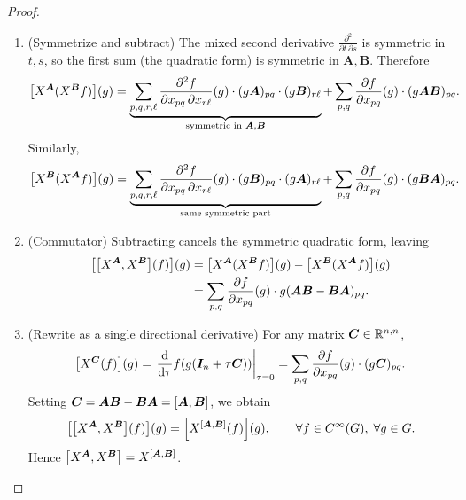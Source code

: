 \documentclass[11pt,reqno]{amsart}
\begin{document}
\begin{proof}
\begin{enumerate}
  \item (Symmetrize and subtract)
  The mixed second derivative $\frac{\partial^2}{\partial t\,\partial s}$ is symmetric in $t,s$,
  so the first sum (the quadratic form) is symmetric in $\bm A,\bm B$.
  Therefore
  \[
    \begin{aligned}
    \FUNC{X^{\bm A}(X^{\bm B}f)}{g}
    &=
    \underbrace{\sum_{p,q,r,\ell}
    \frac{\partial^2 f}{\partial x_{pq}\,\partial x_{r\ell}}(g) \cdot
    (g\bm A)_{pq} \cdot (g\bm B)_{r\ell}}_{\text{symmetric in }\bm A,\bm B}
    +\sum_{p,q}
    \frac{\partial f}{\partial x_{pq}}(g) \cdot
    (g\bm A\bm B)_{pq}.
    \end{aligned}
  \]
  Similarly,
  \[
    \FUNC{X^{\bm B}(X^{\bm A}f)}{g}
    =
    \underbrace{\sum_{p,q,r,\ell}
    \frac{\partial^2 f}{\partial x_{pq}\,\partial x_{r\ell}}(g) \cdot
    (g\bm B)_{pq} \cdot (g\bm A)_{r\ell}}_{\text{same symmetric part}}
    +\sum_{p,q}
    \frac{\partial f}{\partial x_{pq}}(g) \cdot
    (g\bm B\bm A)_{pq}.
  \]

  \item (Commutator)
  Subtracting cancels the symmetric quadratic form, leaving
  \[
    \begin{aligned}
    \FUNC{\SqBr{X^{\bm A}, X^{\bm B}}(f)}{g}
    &=\FUNC{X^{\bm A}(X^{\bm B}f)}{g}
      -\FUNC{X^{\bm B}(X^{\bm A}f)}{g} \\
    &=\sum_{p,q}
    \frac{\partial f}{\partial x_{pq}}(g)
    \cdot g(\bm A\bm B-\bm B\bm A)_{pq}.
    \end{aligned}
  \]

  \item (Rewrite as a single directional derivative)
  For any matrix $\bm C\in\mathbb{R}^{n,n}$,
  \[
    \FUNC{X^{\bm C}(f)}{g}
    =\eval{\frac{\dd}{\dd \tau}
      f\Br{g\Br{\bm I_n+\tau\bm C}}}_{\tau=0}
    =\sum_{p,q}
    \frac{\partial f}{\partial x_{pq}}(g)
    \cdot(g\bm C)_{pq}.
  \]
  Setting $\bm C=\bm A\bm B-\bm B\bm A=\SqBr{\bm A,\bm B}$, we obtain
  \[
    \FUNC{\SqBr{X^{\bm A}, X^{\bm B}}(f)}{g}
    =\FUNC{X^{\SqBr{\bm A,\bm B}}(f)}{g},
    \qquad\forall f\in C^\infty(G),\;\forall g\in G.
  \]
  Hence $\SqBr{X^{\bm A}, X^{\bm B}} = X^{\SqBr{\bm A,\bm B}}$.
  \end{enumerate}
\end{proof}
\end{document}
